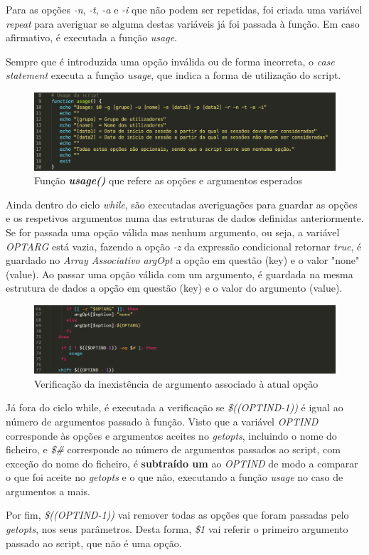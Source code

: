 \documentclass[10pt,portuguese]{article}
\begin{document}
\par Para as opções \textit{-n}, \textit{-t}, \textit{-a} e \textit{-i} que não podem ser repetidas, foi criada uma variável \textit{repeat} para averiguar se alguma destas variáveis já foi passada à função. Em caso afirmativo, é executada a função \textit{usage}.
\par Sempre que é introduzida uma opção inválida ou de forma incorreta, o \textit{case statement} executa a função \textit{usage}, que indica a forma de utilização do script.
\begin{figure}[!h]
    \centering
    \includegraphics[width=\textwidth]{usage.png}
    \caption{Função \textbf{\textit{usage()}} que refere as opções e argumentos esperados}
\end{figure}
\newline
\par Ainda dentro do ciclo \textit{while}, são executadas averiguações para guardar as opções e os respetivos argumentos numa das estruturas de dados definidas anteriormente. Se for passada uma opção válida mas nenhum argumento, ou seja, a variável \textit{OPTARG} está vazia, fazendo a opção \textit{-z} da expressão condicional retornar \textit{true}, é guardado no \textit{Array Associativo} \textit{argOpt} a opção em questão (key) e o valor "none" (value). Ao passar uma opção válida com um argumento, é guardada na mesma estrutura de dados a opção em questão (key) e o valor do argumento (value).
\begin{figure}[!h]
    \centering
    \includegraphics[width=\textwidth]{optarg.png}
    \caption{Verificação da inexistência de argumento associado à atual opção}
\end{figure}
\newline
\par Já fora do ciclo while, é executada a verificação se \textit{\$((OPTIND-1))} é igual ao número de argumentos passado à função. Visto que a variável \textit{OPTIND} corresponde às opções e argumentos aceites no \textit{getopts}, incluindo o nome do ficheiro, e \textit{\$\#} corresponde ao número de argumentos passados ao script, com exceção do nome do ficheiro, é \textbf{subtraído um} ao \textit{OPTIND} de modo a comparar o que foi aceite no \textit{getopts} e o que não, executando a função \textit{usage} no caso de argumentos a mais.
\par Por fim, \textit{\$((OPTIND-1))} vai remover todas as opções que foram passadas pelo \textit{getopts}, nos seus parâmetros. Desta forma, \textit{\$1} vai referir o primeiro argumento passado ao script, que não é uma opção.
\end{document}
